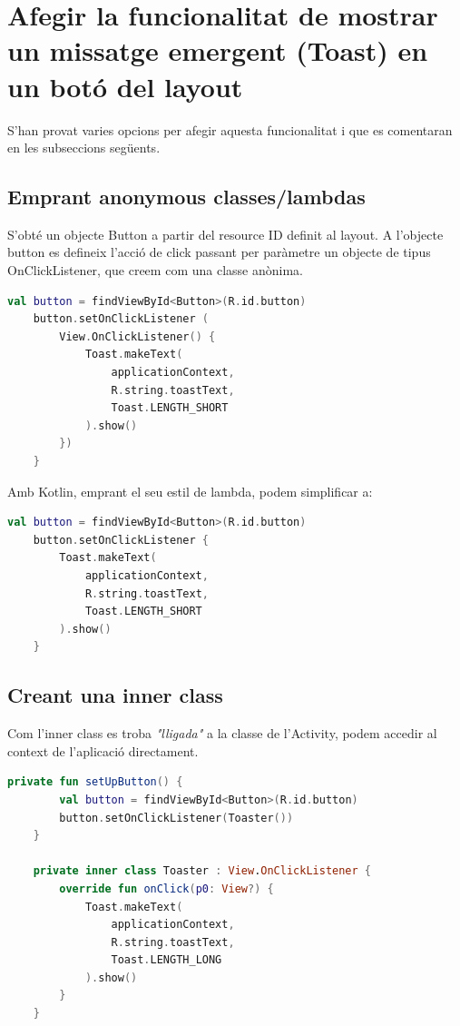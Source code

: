 \documentclass[12pt, letterpaper]{article}
\begin{document}
\newpage
\section{Afegir la funcionalitat de mostrar un missatge emergent (Toast) en un botó del layout}
S'han provat varies opcions per afegir aquesta funcionalitat i que es comentaran en les subseccions següents.

\subsection{Emprant anonymous classes/lambdas}
S'obté un objecte Button a partir del resource ID definit al layout. A l'objecte button es defineix l'acció de click passant per paràmetre un objecte de tipus OnClickListener, que creem com una classe anònima.

\begin{lstlisting}[language=Kotlin]
    val button = findViewById<Button>(R.id.button)
    button.setOnClickListener (
        View.OnClickListener() {
            Toast.makeText(
                applicationContext,
                R.string.toastText,
                Toast.LENGTH_SHORT
            ).show()
        })
    }
\end{lstlisting}

Amb Kotlin, emprant el seu estil de lambda, podem simplificar a:

\begin{lstlisting}[language=Kotlin]
    val button = findViewById<Button>(R.id.button)
    button.setOnClickListener {
        Toast.makeText(
            applicationContext,
            R.string.toastText,
            Toast.LENGTH_SHORT
        ).show()
    }
\end{lstlisting}

\subsection{Creant una inner class}
Com l'inner class es troba \textit{"lligada"} a la classe de l'Activity, podem accedir al context de l'aplicació directament.

\begin{lstlisting}[language=Kotlin]
    private fun setUpButton() {
        val button = findViewById<Button>(R.id.button)
        button.setOnClickListener(Toaster())
    }

    private inner class Toaster : View.OnClickListener {
        override fun onClick(p0: View?) {
            Toast.makeText(
                applicationContext,
                R.string.toastText,
                Toast.LENGTH_LONG
            ).show()
        }
    }
\end{lstlisting}
\end{document}
